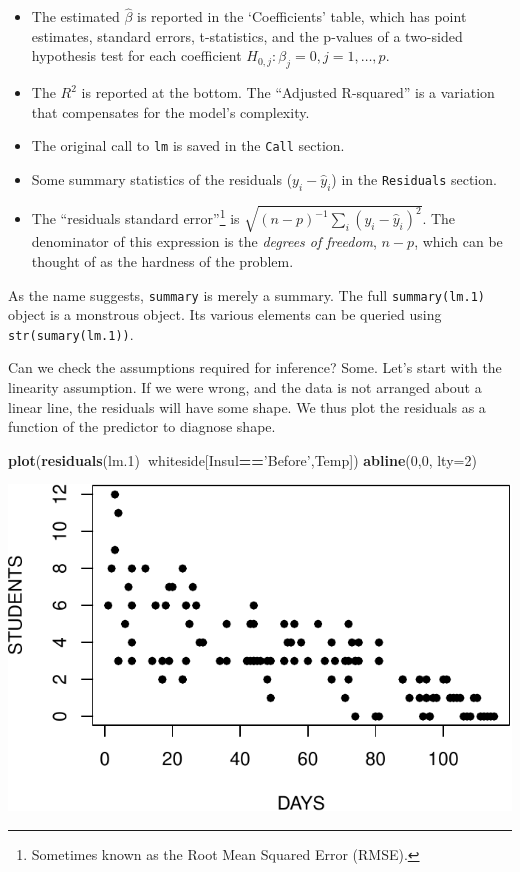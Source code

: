 \documentclass[]{book}
\newenvironment{Shaded}{\begin{snugshade}}{\end{snugshade}}
\newcommand{\KeywordTok}[1]{\textcolor[rgb]{0.13,0.29,0.53}{\textbf{#1}}}
\newcommand{\DataTypeTok}[1]{\textcolor[rgb]{0.13,0.29,0.53}{#1}}
\newcommand{\DecValTok}[1]{\textcolor[rgb]{0.00,0.00,0.81}{#1}}
\newcommand{\StringTok}[1]{\textcolor[rgb]{0.31,0.60,0.02}{#1}}
\newcommand{\OperatorTok}[1]{\textcolor[rgb]{0.81,0.36,0.00}{\textbf{#1}}}
\newcommand{\NormalTok}[1]{#1}
\providecommand{\tightlist}{%
  \setlength{\itemsep}{0pt}\setlength{\parskip}{0pt}}
\theoremstyle{definition}
\theoremstyle{definition}
\theoremstyle{definition}
\theoremstyle{remark}
\begin{document}
\begin{itemize}
\tightlist
\item
  The estimated \(\hat \beta\) is reported in the `Coefficients' table,
  which has point estimates, standard errors, t-statistics, and the
  p-values of a two-sided hypothesis test for each coefficient
  \(H_{0,j}:\beta_j=0, j=1,\dots,p\).
\item
  The \(R^2\) is reported at the bottom. The ``Adjusted R-squared'' is a
  variation that compensates for the model's complexity.
\item
  The original call to \texttt{lm} is saved in the \texttt{Call}
  section.
\item
  Some summary statistics of the residuals (\(y_i-\hat y_i\)) in the
  \texttt{Residuals} section.
\item
  The ``residuals standard error''\footnote{Sometimes known as the Root
    Mean Squared Error (RMSE).} is
  \(\sqrt{(n-p)^{-1} \sum_i (y_i-\hat y_i)^2}\). The denominator of this
  expression is the \emph{degrees of freedom}, \(n-p\), which can be
  thought of as the hardness of the problem.
\end{itemize}

As the name suggests, \texttt{summary} is merely a summary. The full
\texttt{summary(lm.1)} object is a monstrous object. Its various
elements can be queried using \texttt{str(sumary(lm.1))}.

Can we check the assumptions required for inference? Some. Let's start
with the linearity assumption. If we were wrong, and the data is not
arranged about a linear line, the residuals will have some shape. We
thus plot the residuals as a function of the predictor to diagnose
shape.

\begin{Shaded}
\begin{Highlighting}[]
\KeywordTok{plot}\NormalTok{(}\KeywordTok{residuals}\NormalTok{(lm.}\DecValTok{1}\NormalTok{)}\OperatorTok{~}\NormalTok{whiteside[Insul}\OperatorTok{==}\StringTok{'Before'}\NormalTok{,Temp])}
\KeywordTok{abline}\NormalTok{(}\DecValTok{0}\NormalTok{,}\DecValTok{0}\NormalTok{, }\DataTypeTok{lty=}\DecValTok{2}\NormalTok{)}
\end{Highlighting}
\end{Shaded}

\includegraphics[width=0.5\linewidth]{Rcourse_files/figure-latex/unnamed-chunk-143-1}
\end{document}
